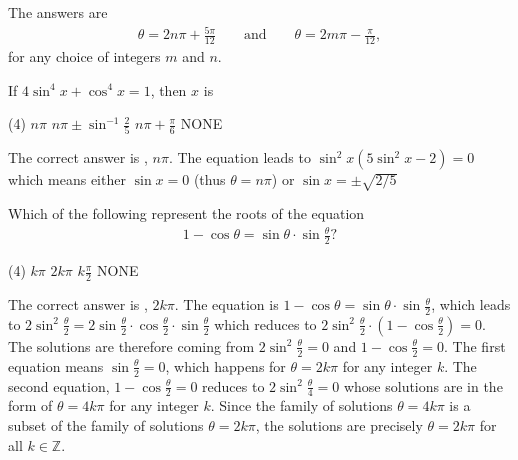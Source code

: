 \documentclass[12pt,a4paper]{memoir}
\theoremstyle{definition}
\newcommand{\correct}{
    \PrintSolutionsTF{%
        \ref{ans:\CurrentQuestionID}%
        }{%
        \label{ans:\CurrentQuestionID}%
        }%
}
\begin{document}
\begin{solution}
	The answers are 
	\begin{align*}
		\theta = 2n\pi+\frac{5\pi}{12} \qquad \text{and} \qquad  \theta = 2m\pi-\frac{\pi}{12},
	\end{align*}
	for any choice of integers $m$ and $n$.
\end{solution}



\begin{question}[name=1989 Roorkee]
	If $4\sin^4 x + \cos^4 x = 1$, then $x$ is
	\begin{tasks}(4)
		\task \correct $n\pi$
		\task $\displaystyle n\pi \pm \sin^{-1}\frac{2}{5}$
		\task $\displaystyle n\pi+\frac{\pi}{6}$
		\task NONE
	\end{tasks}
\end{question}
\begin{solution}[name=1989 Roorkee]
	The correct answer is \correct, $n\pi$. The equation leads to $\sin^2 x(5\sin^2 x - 2)=0$ which means either $\sin x = 0$ (thus $\theta=n\pi$) or $\sin x = \pm \sqrt{2/5}$
\end{solution}

\begin{question}[name=2004 Orissa JEE]
	Which of the following represent the roots of the equation
	\begin{align*}
		1 - \cos \theta = \sin \theta \cdot \sin \frac{\theta}{2}?
	\end{align*}
	\begin{tasks}(4)
		\task $k\pi$
		\task \correct $2k\pi$
		\task $\displaystyle k\frac{\pi}{2}$
		\task NONE
	\end{tasks}
\end{question}
\begin{solution}
	The correct answer is \correct, $2k\pi$. The equation is $1 - \cos \theta = \sin \theta \cdot \sin \frac{\theta}{2}$, which leads to $2\sin^2 \frac{\theta}{2} = 2\sin \frac{\theta}{2} \cdot \cos \frac{\theta}{2} \cdot \sin \frac{\theta}{2}$ which reduces to $2\sin^2 \frac{\theta}{2} \cdot (1-\cos \frac{\theta}{2})=0$. The solutions are therefore coming from $2\sin^2 \frac{\theta}{2}=0$ and $1-\cos\frac{\theta}{2} =0$. The first equation means $\sin \frac{\theta}{2}=0$, which happens for $\theta = 2k\pi$ for any integer $k$. The second equation, $1 - \cos \frac{\theta}{2}=0$ reduces to $2\sin^2\frac{\theta}{4}=0$ whose solutions are in the form of $\theta = 4k\pi$ for any integer $k$. Since the family of solutions $\theta=4k\pi$ is a subset of the family of solutions $\theta=2k\pi$, the solutions are precisely $\theta=2k\pi$ for all $k\in\mathbb Z$.
\end{solution}
\end{document}
